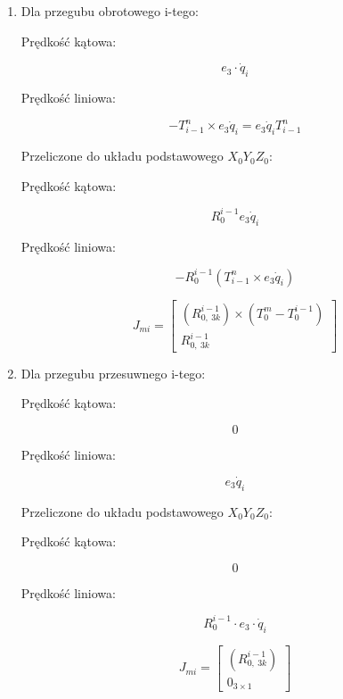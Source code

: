 \documentclass{article}
\newenvironment{kol2}{\noindent \begin{minipage}[t]{0.5\linewidth}}{\end{minipage}}
\begin{document}
\begin{enumerate}
    \item Dla przegubu obrotowego i-tego:

    \begin{kol2}
        Prędkość kątowa:

        \Large
        $$  e_3 \cdot \dot{q}_i $$
        \normalsize
    \end{kol2}
    \begin{kol2}
        Prędkość liniowa:

        \Large
        $$  -T_{i-1}^n \times e_3 \dot{q}_i = e_3 \dot{q}_i T_{i-1}^n $$
        \normalsize
    \end{kol2}

    Przeliczone do układu podstawowego $X_0Y_0Z_0$:

    \begin{kol2}
        Prędkość kątowa:

        \Large
        $$  R_0^{i-1} e_3 \dot{q}_i $$
        \normalsize
    \end{kol2}
    \begin{kol2}
        Prędkość liniowa:

        \Large
        $$  -R_0^{i-1}(T_{i-1}^n \times e_3 \dot{q}_i ) $$
        \normalsize
    \end{kol2}

    \vspace{0.5cm}
    \Large
    $$  J_{mi} = \begin{bmatrix}
        (R_{0,\ 3k}^{i-1}) \times (T_0^m - T_0^{i-1}) \\
        R_{0,\ 3k}^{i-1}
        \end{bmatrix}
    $$
    \normalsize

    \item Dla przegubu przesuwnego i-tego:

    \begin{kol2}
        Prędkość kątowa:

        $$  0 $$
    \end{kol2}
    \begin{kol2}
        Prędkość liniowa:

        $$  e_3 \dot{q}_i $$
    \end{kol2}

    Przeliczone do układu podstawowego $X_0Y_0Z_0$:

    \begin{kol2}
        Prędkość kątowa:

        $$  0 $$
    \end{kol2}
    \begin{kol2}
        Prędkość liniowa:

        $$  R_0^{i-1} \cdot e_3 \cdot \dot{q}_i $$
    \end{kol2}

    \vspace{0.5cm}
    \Large
    $$  J_{mi} = \begin{bmatrix}
        (R_{0,\ 3k}^{i-1}) \\
        0_{3\times 1}
        \end{bmatrix}
    $$
    \normalsize

\end{enumerate}
\end{document}
